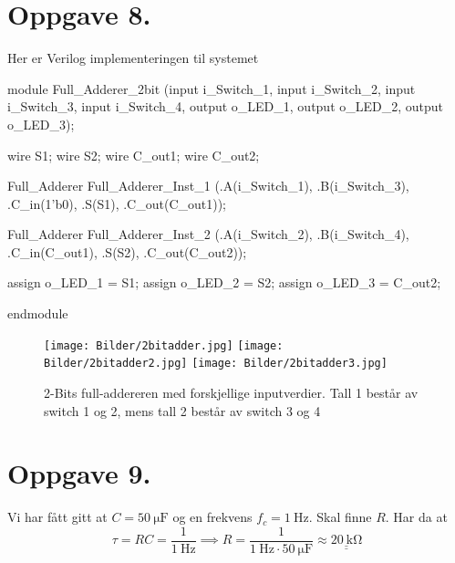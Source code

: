 \documentclass[a4paper,11pt,norsk]{article}
\begin{document}
\newpage
\section*{Oppgave 8.}
Her er Verilog implementeringen til systemet
\begin{verilogcode}
module Full_Adderer_2bit
    (input i_Switch_1,
     input i_Switch_2,
     input i_Switch_3,
     input i_Switch_4,
     output o_LED_1,
     output o_LED_2,
     output o_LED_3);

 wire S1;
 wire S2;
 wire C_out1;
 wire C_out2;

 Full_Adderer Full_Adderer_Inst_1
    (.A(i_Switch_1),
     .B(i_Switch_3),
     .C_in(1'b0),
     .S(S1),
     .C_out(C_out1));

 Full_Adderer Full_Adderer_Inst_2
    (.A(i_Switch_2),
     .B(i_Switch_4),
     .C_in(C_out1),
     .S(S2),
     .C_out(C_out2));

 assign o_LED_1 = S1;
 assign o_LED_2 = S2;
 assign o_LED_3 = C_out2;

endmodule
\end{verilogcode}
\begin{figure}[H]
    \centering
    \texttt{[image: Bilder/2bitadder.jpg]}
    \texttt{[image: Bilder/2bitadder2.jpg]}
    \texttt{[image: Bilder/2bitadder3.jpg]}
    \caption{2-Bits full-addereren med forskjellige inputverdier. Tall 1 består av switch 1 og 2, mens tall 2 består av switch 3 og 4}
\end{figure}

\section*{Oppgave 9.}
Vi har fått gitt at $C = \SI{50}{\micro\farad}$ og en frekvens $f_c = \SI{1}{\hertz}$.
Skal finne $R$. Har da at 
\[
    \tau = RC = \frac{1}{\SI{1}{\hertz}} \implies R = \frac{1}{\SI{1}{\hertz} \cdot \SI{50}{\micro\farad}} \approx \underline{\underline{\SI{20}{\kilo\ohm}}}
\]
\end{document}
